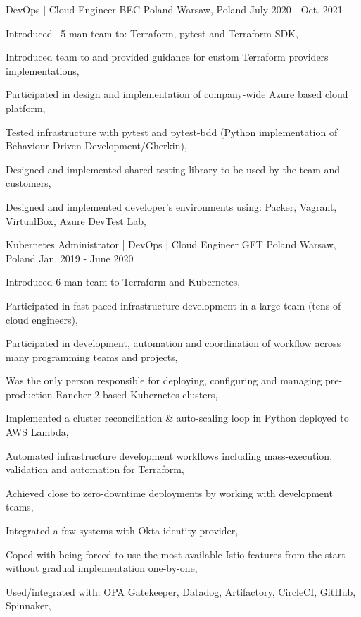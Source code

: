 \begin{cventries}
    \cventry
    {DevOps | Cloud Engineer} %
    {BEC Poland} %
    {Warsaw, Poland} %
    {July 2020 - Oct. 2021} %
    {
        \begin{cvitems} %
            \item {Introduced ~5 man team to: Terraform, pytest and Terraform SDK,}
            \item {Introduced team to and provided guidance for custom Terraform providers implementations,}
            \item {Participated in design and implementation of company-wide Azure based cloud platform,}
            \item {Tested infrastructure with pytest and pytest-bdd (Python implementation of Behaviour Driven Development/Gherkin),}
            \item {Designed and implemented shared testing library to be used by the team and customers,}
            \item {Designed and implemented developer's environments using: Packer, Vagrant, VirtualBox, Azure DevTest Lab,}
        \end{cvitems}
    }

    \cventry
    {Kubernetes Administrator | DevOps | Cloud Engineer} %
    {GFT Poland} %
    {Warsaw, Poland} %
    {Jan. 2019 - June 2020} %
    {
        \begin{cvitems} %
            \item {Introduced 6-man team to Terraform and Kubernetes,}
            \item {Participated in fast-paced infrastructure development in a large team (tens of cloud engineers),}
            \item {Participated in development, automation and coordination of workflow across many programming teams and projects,}
            \item {Was the only person responsible for deploying, configuring and managing pre-production Rancher 2 based Kubernetes clusters,}
            \item {Implemented a cluster reconciliation \& auto-scaling loop in Python deployed to AWS Lambda,}
            \item {Automated infrastructure development workflows including mass-execution, validation and automation for Terraform,}
            \item {Achieved close to zero-downtime deployments by working with development teams,}
            \item {Integrated a few systems with Okta identity provider,}
            \item {Coped with being forced to use the most available Istio features from the start without gradual implementation one-by-one,}
            \item {Used/integrated with: OPA Gatekeeper, Datadog, Artifactory, CircleCI, GitHub, Spinnaker,}
        \end{cvitems}
    }


\end{cventries}
